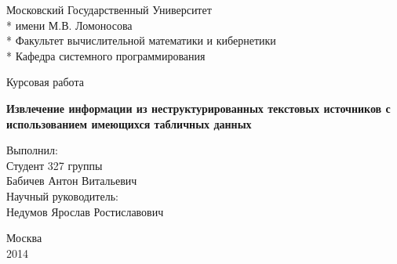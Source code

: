 \begin{titlepage}
\newpage

\begin{center}
\vspace{7cm}
Московский Государственный Университет \\*
имени М.В. Ломоносова \\*
Факультет вычислительной математики и кибернетики \\*
Кафедра системного программирования \\
\end{center}

\vspace{16em}

\begin{center}
\Large Курсовая работа
\end{center}

\begin{center}
\Large{\textbf{Извлечение информации \linebreak из неструктурированных текстовых источников \linebreak с использованием имеющихся табличных данных}}
\end{center}

\vspace{10em}

\begin{flushright}
Выполнил: \\
Студент 327 группы \\
Бабичев Антон Витальевич \\
\vspace{1.5em}
Научный руководитель: \\
Недумов Ярослав Ростиславович \\
\end{flushright}

\vspace{\fill}

\begin{center}
Москва \\
2014
\end{center}

\end{titlepage}